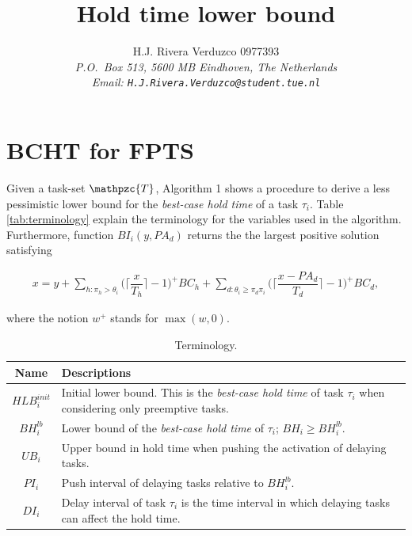 \documentclass[fleqn]{article}
\title{\sf Hold time lower bound}
\author{{\sf H.J. Rivera Verduzco 0977393}\\
{\footnotesize\sl P.O.~Box 513, 5600 MB Eindhoven, The Netherlands}\\
{\footnotesize \sl Email: \tt H.J.Rivera.Verduzco@student.tue.nl}}
\begin{document}
\maketitle


\section{BCHT for FPTS}

Given a task-set $\mathpzc{T}$, Algorithm 1 shows a procedure to derive a less pessimistic lower bound for the \textit{best-case hold time} of a task $\tau_i$. Table \ref{tab:terminology} explain the terminology for the variables used in the algorithm. Furthermore, function $BI_i(y,PA_d)$ returns the the largest positive solution satisfying

\begin{align}
x = y + \sum\limits_{h:\pi_h > \theta_i} \Big( \Big\lceil  \dfrac{x}{T_h}\Big\rceil -1 \Big)^+  BC_h + \sum\limits_{d:\theta_i \geq \pi_d \pi_i} \Big( \Big\lceil  \dfrac{x-PA_d}{T_d}\Big\rceil -1 \Big)^+  BC_d,
\end{align}

\noindent
where the notion $w^+$ stands for $\max(w,0)$.

\begin{table}[H]
	\center
	\caption{Terminology.}
	\label{tab:terminology_ht}
	\begin{tabular}{|c | p{9cm}|}
		\hline
		Name & Descriptions \\ 
		\hline 
		\hline
		$HLB^{init}_i$& Initial lower bound. This is the \textit{best-case hold time} of task $\tau_i$ when considering only preemptive tasks.\\
		\hline
		$BH^{lb}_i$& Lower bound of the \textit{best-case hold time} of $\tau_i$; $BH_i \geq BH^{lb}_i.$\\
		\hline
		$UB_i$& Upper bound in hold time when pushing the activation of delaying tasks. \\ 
		\hline
		$PI_i$ & Push interval of delaying tasks relative to $BH^{lb}_i$.   \\ 
		\hline
		$DI_i$ & Delay interval of task $\tau_i$ is the time interval in which delaying tasks can affect the hold time.\\
		\hline 
	\end{tabular}
\end{table} 
\end{document}
